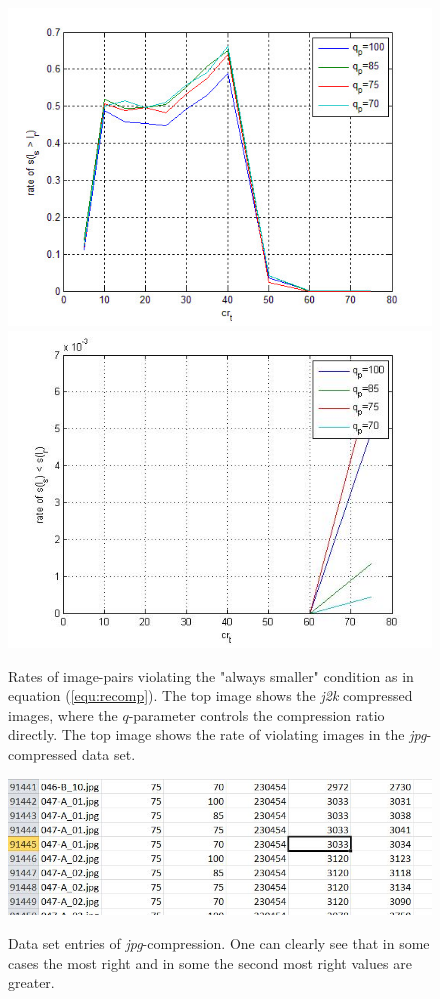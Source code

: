 \documentclass[10pt,twocolumn,letterpaper]{article}
\begin{document}
\begin{figure}
	\includegraphics[width=\linewidth]{img/conditionViolation_j2k.jpg}
	\includegraphics[width=\linewidth]{img/conditionViolation_jpg.jpg}
	
	\label{fig:errRates}
	\caption{Rates of image-pairs violating the "always smaller" condition as in equation (\ref{equ:recomp}). The top image shows the \emph{j2k} compressed images, where the $q$-parameter controls the compression ratio directly. The top image shows the rate of violating images in the \emph{jpg}-compressed data set.}
\end{figure}

\begin{figure}
	\includegraphics[width=\linewidth]{img/suspiciousDatasets.jpg}
	\label{fig:suspicious}
	\caption{Data set entries of \emph{jpg}-compression. One can clearly see that in some cases the most right and in some the second most right values are greater.}
\end{figure}
\end{document}
